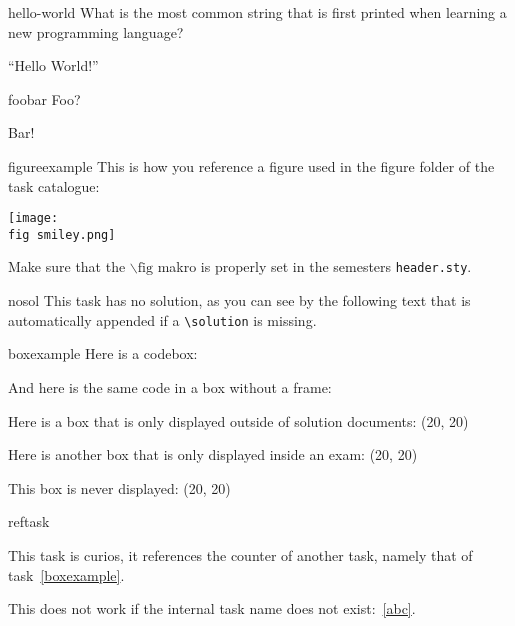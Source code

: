 
\begin{task}{hello-world}
What is the most common string that is first printed when learning a new programming language?
    
\solution

``Hello World!''
\end{task}



\begin{task}{foobar}
Foo?
    
\solution

Bar!
\end{task}



\begin{task}{figureexample}
This is how you reference a figure used in the figure folder of the task catalogue:

\centerline{\texttt{[image: \\fig smiley.png]}}

Make sure that the $\backslash \text{fig}$ makro is properly set in the semesters \verb!header.sty!.
\end{task}



\begin{task}{nosol}
This task has no solution, as you can see by the following text that is automatically 
appended if a \verb!\solution! is missing.
\end{task}



\begin{task}{boxexample}
\lstset{language=Python}
Here is a codebox:


And here is the same code in a box without a frame:


Here is a box that is only displayed outside of solution documents: \Box(20, 20)

Here is another box that is only displayed inside an exam: \KBox(20, 20)

\solution

This box is never displayed: \Box(20, 20)

\end{task}



\begin{task}{reftask}

This task is curios, it references the counter of another task, namely that of
task~\ref{boxexample}.

\solution

This does not work if the internal task name does not exist:~\ref{abc}.

\end{task}